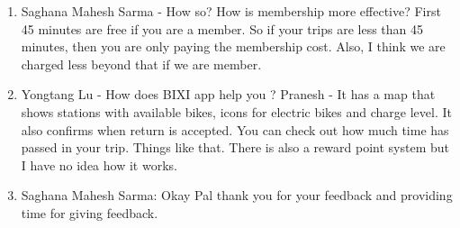 \begin{enumerate}
    \item Saghana Mahesh Sarma - How so? How is membership more effective?
    \newline First 45 minutes are free if you are a member. So if your trips are less than 45 minutes, then you are only paying the membership cost. Also, I think we are charged less beyond that if we are member.
    \item Yongtang Lu - How does BIXI app help you ?
    \newline Pranesh - It has a map that shows stations with available bikes, icons for electric bikes and charge level. It also confirms when return is accepted. You can check out how much time has passed in your trip. Things like that. There is also a reward point system but I have no idea how it works.
    \item Saghana Mahesh Sarma: Okay Pal thank you for your feedback and providing time for giving feedback. 
\end{enumerate}


